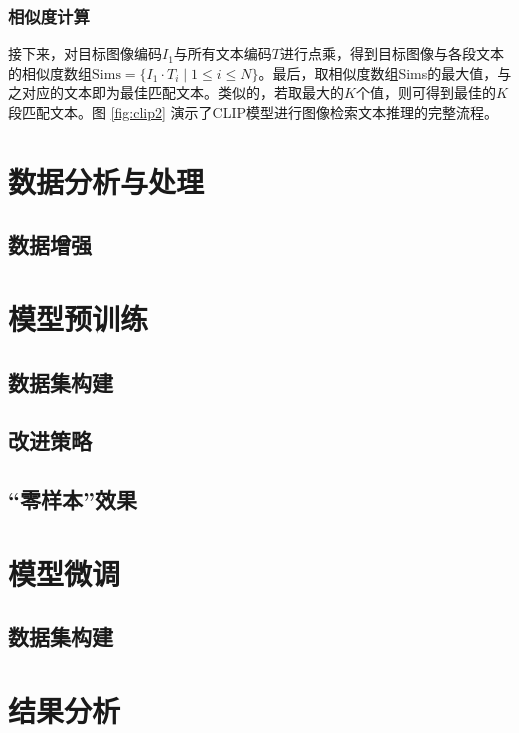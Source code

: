 \documentclass[a4paper]{zreport}
\begin{document}
\subsubsection{相似度计算}

接下来，对目标图像编码$I_1$与所有文本编码$T$进行点乘，得到目标图像与各段文本的相似度数组$\mathrm{Sims} = \{I_1 \cdot T_i \mid 1 \le i \le N\}$。最后，取相似度数组Sims的最大值，与之对应的文本即为最佳匹配文本。类似的，若取最大的$K$个值，则可得到最佳的$K$段匹配文本。图 \ref{fig:clip2} 演示了CLIP模型进行图像检索文本推理的完整流程。

\section{数据分析与处理}

\subsection{数据增强}

\section{模型预训练}

\subsection{数据集构建}



\subsection{改进策略}

\subsection{“零样本”效果}

\section{模型微调}

\subsection{数据集构建}

\section{结果分析}



\cite{*}

\newpage




\end{document}
